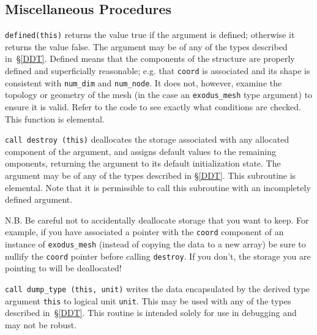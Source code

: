 \documentclass[oneside,12pt]{amsart}
\newenvironment{mydesc}%
  {\begin{list}{}{%
    \setlength{\labelsep}{0pt}%
    \setlength{\itemindent}{-\leftmargin}%
    \setlength{\itemsep}{\parskip}%
    \setlength{\listparindent}{0pt}\setlength{\parsep}{\parskip}}}
  {\end{list}}
\begin{document}
\subsection{Miscellaneous Procedures}
\begin{mydesc}
\item \texttt{defined(this)} returns the value true if the argument is
  defined; otherwise it returns the value false.  The argument may be of
  any of the types described in~\S\ref{DDT}.  Defined means that the
  components of the structure are properly defined and superficially
  reasonable; e.g. that \texttt{coord} is associated and its shape is
  consistent with \texttt{num_dim} and \texttt{num_node}.  It does not,
  however, examine the topology or geometry of the mesh (in the case an
  \texttt{exodus_mesh} type argument) to ensure it is valid.  Refer to
  the code to see exactly what conditions are checked.
  This function is elemental.
  
\item \texttt{call destroy (this)} deallocates the storage associated with
  any allocated component of the argument, and assigns default values to the
  remaining omponents, returning the argument to its default initialization
  state.  The argument may be of any of the types described in \S\ref{DDT}.
  This subroutine is elemental.  Note that it is permissible to call this
  subroutine with an incompletely defined argument.
    
  N.B.  Be careful not to accidentally deallocate storage that you want to
  keep.  For example, if you have associated a pointer with the \texttt{coord}
  component of an instance of \texttt{exodus_mesh} (instead of copying the
  data to a new array) be sure to nullify the \texttt{coord} pointer before
  calling \texttt{destroy}.  If you don't, the storage you are pointing to
  will be deallocated!
  
\item \texttt{call dump_type (this, unit)} writes the data encapsulated by
  the derived type argument \texttt{this} to logical unit \texttt{unit}.
  This may be used with any of the types described in~\S\ref{DDT}.
  This routine is intended solely for use in debugging and may not be robust.
\end{mydesc}
\end{document}
